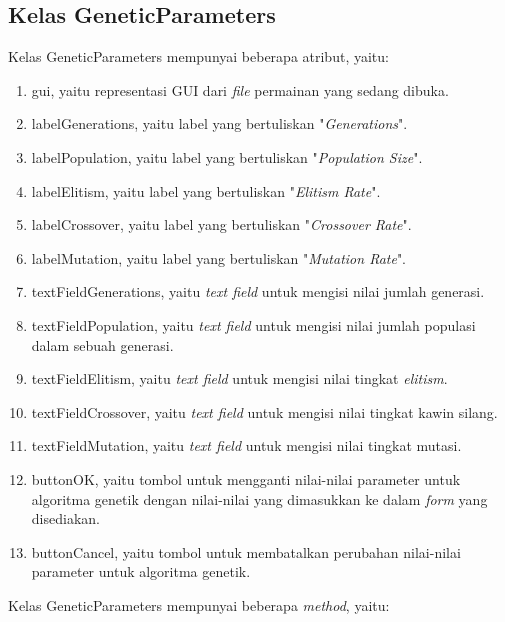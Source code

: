 \subsection{Kelas GeneticParameters}
\label{sec:kelasgeneticparamater}

Kelas GeneticParameters mempunyai beberapa atribut, yaitu:

\begin{enumerate}
\item gui, yaitu representasi GUI dari \textit{file} permainan yang sedang dibuka.
\item labelGenerations, yaitu label yang bertuliskan "\textit{Generations}".
\item labelPopulation, yaitu label yang bertuliskan "\textit{Population Size}".
\item labelElitism, yaitu label yang bertuliskan "\textit{Elitism Rate}".
\item labelCrossover, yaitu label yang bertuliskan "\textit{Crossover Rate}".
\item labelMutation, yaitu label yang bertuliskan "\textit{Mutation Rate}".
\item textFieldGenerations, yaitu \textit{text field} untuk mengisi nilai jumlah generasi.
\item textFieldPopulation, yaitu \textit{text field} untuk mengisi nilai jumlah populasi dalam sebuah generasi.
\item textFieldElitism, yaitu \textit{text field} untuk mengisi nilai tingkat \textit{elitism}.
\item textFieldCrossover, yaitu \textit{text field} untuk mengisi nilai tingkat kawin silang.
\item textFieldMutation, yaitu \textit{text field} untuk mengisi nilai tingkat mutasi.
\item buttonOK, yaitu tombol untuk mengganti nilai-nilai parameter untuk algoritma genetik dengan nilai-nilai yang dimasukkan ke dalam \textit{form} yang disediakan.
\item buttonCancel, yaitu tombol untuk membatalkan perubahan nilai-nilai parameter untuk algoritma genetik.
\end{enumerate}

Kelas GeneticParameters mempunyai beberapa \textit{method}, yaitu:

